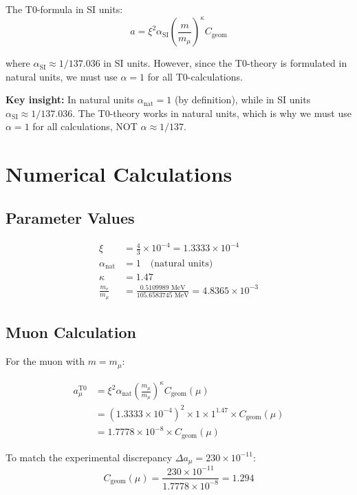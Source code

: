\documentclass[12pt,a4paper]{article}
\newcommand{\xipar}{\xi}
\newcommand{\alphaSI}{\alpha_{\text{SI}}}
\newcommand{\alphaNAT}{\alpha_{\text{nat}}}
\newcommand{\Cgeom}{C_{\text{geom}}}
\newcommand{\kappaT}{\kappa}
\newcommand{\mmu}{m_{\mu}}
\newcommand{\melec}{m_{e}}
\begin{document}
	The T0-formula in SI units:
	\begin{equation}
		a = \xipar^2 \alphaSI \left(\frac{m}{\mmu}\right)^{\kappaT} \Cgeom
	\end{equation}
	
	where $\alphaSI \approx 1/137.036$ in SI units. However, since the T0-theory is formulated in natural units, we must use $\alpha = 1$ for all T0-calculations.
	
	\textbf{Key insight:} In natural units $\alphaNAT = 1$ (by definition), while in SI units $\alphaSI \approx 1/137.036$. The T0-theory works in natural units, which is why we must use $\alpha = 1$ for all calculations, NOT $\alpha \approx 1/137$.
	
	\section{Numerical Calculations}
	
	\subsection{Parameter Values}
	
	\begin{align}
		\xipar &= \frac{4}{3} \times 10^{-4} = 1.3333 \times 10^{-4} \\
		\alphaNAT &= 1 \quad \text{(natural units)} \\
		\kappaT &= 1.47 \\
		\frac{\melec}{\mmu} &= \frac{0.5109989 \text{ MeV}}{105.6583745 \text{ MeV}} = 4.8365 \times 10^{-3}
	\end{align}
	
	\subsection{Muon Calculation}
	
	For the muon with $m = \mmu$:
	
	\begin{align}
		a_\mu^{\text{T0}} &= \xipar^2 \alphaNAT \left(\frac{\mmu}{\mmu}\right)^{\kappaT} \Cgeom(\mu) \\
		&= (1.3333 \times 10^{-4})^2 \times 1 \times 1^{1.47} \times \Cgeom(\mu) \\
		&= 1.7778 \times 10^{-8} \times \Cgeom(\mu)
	\end{align}
	
	To match the experimental discrepancy $\Delta a_\mu = 230 \times 10^{-11}$:
	\begin{equation}
		\Cgeom(\mu) = \frac{230 \times 10^{-11}}{1.7778 \times 10^{-8}} = 1.294
	\end{equation}
	
\end{document}
